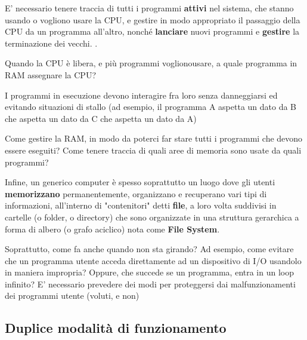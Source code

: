 E’ necessario tenere traccia di tutti i programmi \textbf{attivi} nel sistema, che stanno usando o vogliono usare la CPU, e gestire in modo appropriato il passaggio della CPU da un programma all’altro, nonché \textbf{lanciare} nuovi programmi e \textbf{gestire} la terminazione dei vecchi.
.

Quando la CPU è libera, e più programmi voglionousare, a quale programma in RAM assegnare la CPU?

I programmi in esecuzione devono interagire fra loro senza danneggiarsi ed evitando situazioni di stallo (ad esempio, il programma A aspetta un dato da B che aspetta un dato da C che aspetta un dato da A)

Come gestire la RAM, in modo da poterci far stare tutti i programmi che devono essere eseguiti? Come tenere traccia di quali aree di memoria sono usate da quali programmi?

Infine, un generico computer è spesso soprattutto un luogo dove gli utenti \textbf{memorizzano} permanentemente, organizzano e recuperano vari tipi di informazioni, all’interno di "contenitori" detti \textbf{file}, a loro volta suddivisi in cartelle (o folder, o directory) che sono organizzate in una struttura gerarchica a forma di albero (o grafo aciclico) nota come \textbf{File System}.


Soprattutto, come fa anche quando non sta girando?
Ad esempio, come evitare che un programma utente acceda direttamente ad un dispositivo di I/O usandolo in maniera impropria?
Oppure, che succede se un programma, entra in un loop infinito?
E’ necessario prevedere dei modi per proteggersi dai malfunzionamenti dei programmi utente (voluti, e non)

\subsection{Duplice modalità di funzionamento}

